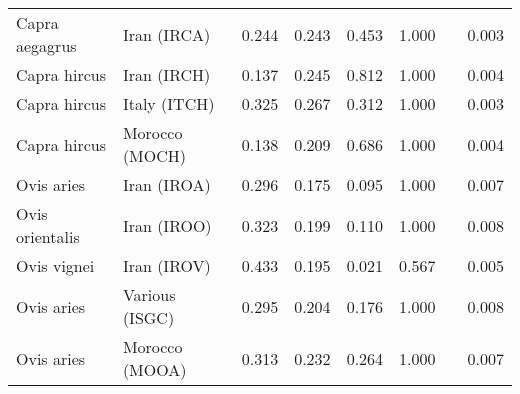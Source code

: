 \begin{center}
\begin{adjustbox}{width = 1\textwidth}
\begin{tabular}{|l|l|r|r|r|r|r|}
      Capra aegagrus &                     Iran (IRCA) &                                              0.244 &                                              0.243 &                0.453 &                                  1.000~~ &              0.003 \\
        Capra hircus &                     Iran (IRCH) &                                              0.137 &                                              0.245 &                0.812 &                                  1.000~~ &              0.004 \\
        Capra hircus &                    Italy (ITCH) &                                              0.325 &                                              0.267 &                0.312 &                                  1.000~~ &              0.003 \\
        Capra hircus &                  Morocco (MOCH) &                                              0.138 &                                              0.209 &                0.686 &                                  1.000~~ &              0.004 \\
          Ovis aries &                     Iran (IROA) &                                              0.296 &                                              0.175 &                0.095 &                                  1.000~~ &              0.007 \\
     Ovis orientalis &                     Iran (IROO) &                                              0.323 &                                              0.199 &                0.110 &                                  1.000~~ &              0.008 \\
         Ovis vignei &                     Iran (IROV) &                                              0.433 &                                              0.195 &                0.021 &                                  0.567~~ &              0.005 \\
          Ovis aries &                  Various (ISGC) &                                              0.295 &                                              0.204 &                0.176 &                                  1.000~~ &              0.008 \\
          Ovis aries &                  Morocco (MOOA) &                                              0.313 &                                              0.232 &                0.264 &                                  1.000~~ &              0.007 \\

\end{tabular}
\end{adjustbox}
\end{center}
